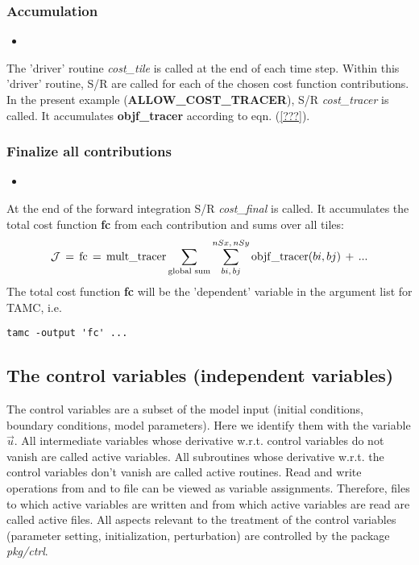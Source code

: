 \subsubsection{Accumulation}
%
\begin{itemize}
%
\item 
{}
\end{itemize}
%
The 'driver' routine
{\it cost\_tile} is called at the end of each time step.
Within this 'driver' routine, S/R are called for each of
the chosen cost function contributions.
In the present example ({\bf ALLOW\_COST\_TRACER}),
S/R {\it cost\_tracer} is called.
It accumulates {\bf objf\_tracer} according to eqn. (\ref{???}).
%
\subsubsection{Finalize all contributions}
%
\begin{itemize}
%
\item 
{}
\end{itemize}
%
At the end of the forward integration S/R {\it cost\_final}
is called. It accumulates the total cost function {\bf fc}
from each contribution and sums over all tiles:
\begin{equation}
{\cal J} \, = \, 
{\rm fc} \, = \, 
{\rm mult\_tracer} \sum_{\text{global sum}} \sum_{bi,\,bj}^{nSx,\,nSy}
{\rm objf\_tracer}(bi,bj) \, + \, ...
\end{equation}
%
The total cost function {\bf fc} will be the
'dependent' variable in the argument list for TAMC, i.e.
\begin{verbatim}
tamc -output 'fc' ...
\end{verbatim}




\subsection{The control variables (independent variables)
\label{section_ctrl}}

The control variables are a subset of the model input
(initial conditions, boundary conditions, model parameters).
Here we identify them with the variable $ \vec{u} $.
All intermediate variables whose derivative w.r.t. control
variables do not vanish are called {\sf active variables}.
All subroutines whose derivative w.r.t. the control variables
don't vanish are called {\sf active routines}.
Read and write operations from and to file can be viewed
as variable assignments. Therefore, files to which
active variables are written and from which active variables
are read are called {\sf active files}.
All aspects relevant to the treatment of the control variables
(parameter setting, initialization, perturbation)
are controlled by the package {\it pkg/ctrl}.

